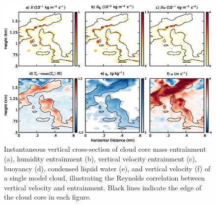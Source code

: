 \documentclass[draft,grl]{agutex}
\begin{document}
\begin{figure}
  \noindent\includegraphics[width=39pc]{./figures/w_entrainment_example}
  \caption{Instantaneous vertical cross-section of cloud core mass entrainment 
  (a), humidity entrainment (b), vertical velocity entrainment (c), buoyancy 
  (d), condensed liquid water (e), and vertical velocity (f) of a single model
  cloud, illustrating the Reynolds correlation between vertical velocity and 
  entrainment.  Black lines indicate the edge of the cloud core in each figure.}
  \label{fig:w_entrainment_example}
\end{figure}
\end{document}
